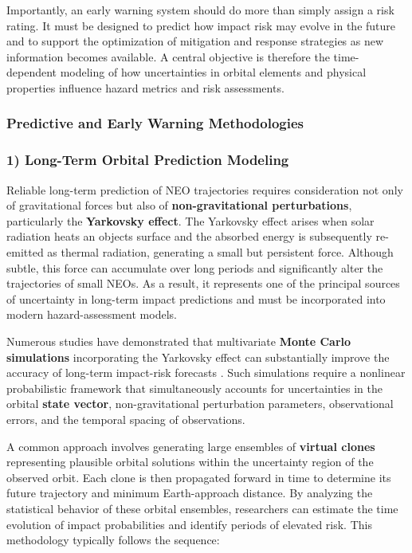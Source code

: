 Importantly, an early warning system should do more than simply assign a risk rating. It must be designed to predict how impact risk may evolve in the future and to support the optimization of mitigation and response strategies as new information becomes available. A central objective is therefore the time-dependent modeling of how uncertainties in orbital elements and physical properties influence hazard metrics and risk assessments.

\subsubsection{Predictive and Early Warning Methodologies}

\subsubsection{1) Long-Term Orbital Prediction Modeling}\label{long-term-orbital-prediction-modeling}

Reliable long-term prediction of NEO trajectories requires consideration not only of gravitational forces but also of \textbf{non-gravitational perturbations}, particularly the \textbf{Yarkovsky effect}. The Yarkovsky effect arises when solar radiation heats an object\textquotesingle s surface and the absorbed energy is subsequently re-emitted as thermal radiation, generating a small but persistent force. Although subtle, this force can accumulate over long periods and significantly alter the trajectories of small NEOs. As a result, it represents one of the principal sources of uncertainty in long-term impact predictions and must be incorporated into modern hazard-assessment models.

Numerous studies have demonstrated that multivariate \textbf{Monte Carlo simulations} incorporating the Yarkovsky effect can substantially improve the accuracy of long-term impact-risk forecasts \cite{vokrouhlicky2015}. Such simulations require a nonlinear probabilistic framework that simultaneously accounts for uncertainties in the orbital \textbf{state vector}, non-gravitational perturbation parameters, observational errors, and the temporal spacing of observations.

A common approach involves generating large ensembles of \textbf{virtual clones} representing plausible orbital solutions within the uncertainty region of the observed orbit. Each clone is then propagated forward in time to determine its future trajectory and minimum Earth-approach distance. By analyzing the statistical behavior of these orbital ensembles, researchers can estimate the time evolution of impact probabilities and identify periods of elevated risk. This methodology typically follows the sequence:

